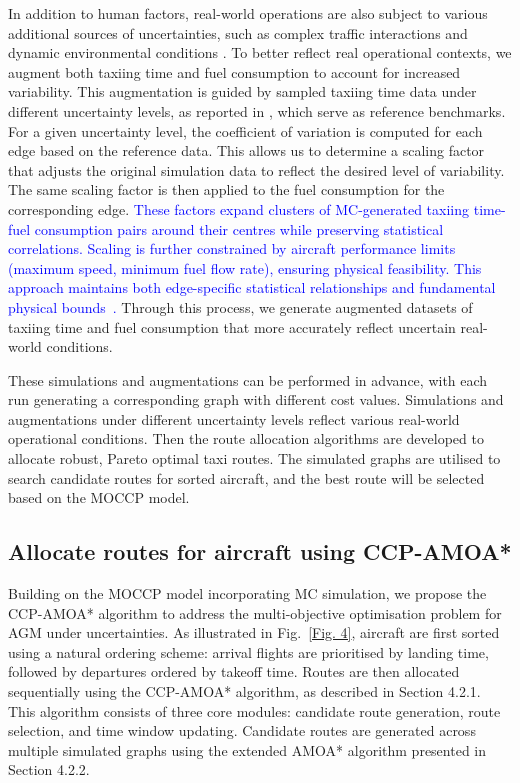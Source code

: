 \documentclass{article}
\newcommand*{\blue}{\textcolor{blue}}
\begin{document}
In addition to human factors, real-world operations are also subject to various additional sources of uncertainties, such as complex traffic interactions and dynamic environmental conditions \cite{cook2016complexity, tang2014construction}. To better reflect real operational contexts, we augment both taxiing time and fuel consumption to account for increased variability. This augmentation is guided by sampled taxiing time data under different uncertainty levels, as reported in \cite{wang2021chance}, which serve as reference benchmarks. For a given uncertainty level, the coefficient of variation is computed for each edge based on the reference data. This allows us to determine a scaling factor that adjusts the original simulation data to reflect the desired level of variability. The same scaling factor is then applied to the fuel consumption for the corresponding edge. \blue{These factors expand clusters of MC-generated taxiing time-fuel consumption pairs around their centres while preserving statistical correlations. Scaling is further constrained by aircraft performance limits (maximum speed, minimum fuel flow rate), ensuring physical feasibility. This approach maintains both edge-specific statistical relationships and fundamental physical bounds~\cite{maharana2022review}.} Through this process, we generate augmented datasets of taxiing time and fuel consumption that more accurately reflect uncertain real-world conditions.

These simulations and augmentations can be performed in advance, with each run generating a corresponding graph with different cost values. Simulations and augmentations under different uncertainty levels reflect various real-world operational conditions. Then the route allocation algorithms are developed to allocate robust, Pareto optimal taxi routes. The simulated graphs are utilised to search candidate routes for sorted aircraft, and the best route will be selected based on the MOCCP model. 

\subsection{Allocate routes for aircraft using CCP-AMOA*}

Building on the MOCCP model incorporating MC simulation, we propose the CCP-AMOA* algorithm to address the multi-objective optimisation problem for AGM under uncertainties. As illustrated in Fig.~\ref{Fig. 4}, aircraft are first sorted using a natural ordering scheme: arrival flights are prioritised by landing time, followed by departures ordered by takeoff time. Routes are then allocated sequentially using the CCP-AMOA* algorithm, as described in Section 4.2.1. This algorithm consists of three core modules: candidate route generation, route selection, and time window updating. Candidate routes are generated across multiple simulated graphs using the extended AMOA* algorithm presented in Section 4.2.2.
\end{document}
